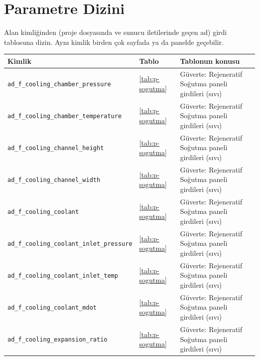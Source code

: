 \documentclass[11pt,a4paper]{article}
\begin{document}
\section{Parametre Dizini}\label{sec:ekd}

Alan kimliğinden (proje dosyasında ve sunucu iletilerinde geçen ad) girdi
tablosuna dizin. Aynı kimlik birden çok sayfada ya da panelde geçebilir.

{\small\begin{longtable}{@{}>{\raggedright\arraybackslash}p{5.2cm}p{1.4cm}>{\raggedright\arraybackslash}p{7.4cm}@{}}
\toprule \textbf{Kimlik} & \textbf{Tablo} & \textbf{Tablonun konusu} \\ \midrule \endhead
\bottomrule \endlastfoot
\texttt{ad\_\allowbreak{}f\_\allowbreak{}cooling\_\allowbreak{}chamber\_\allowbreak{}pressure} & \ref{tab:p-sogutma} & Güverte: Rejeneratif Soğutma paneli girdileri (sıvı) \\
\texttt{ad\_\allowbreak{}f\_\allowbreak{}cooling\_\allowbreak{}chamber\_\allowbreak{}temperature} & \ref{tab:p-sogutma} & Güverte: Rejeneratif Soğutma paneli girdileri (sıvı) \\
\texttt{ad\_\allowbreak{}f\_\allowbreak{}cooling\_\allowbreak{}channel\_\allowbreak{}height} & \ref{tab:p-sogutma} & Güverte: Rejeneratif Soğutma paneli girdileri (sıvı) \\
\texttt{ad\_\allowbreak{}f\_\allowbreak{}cooling\_\allowbreak{}channel\_\allowbreak{}width} & \ref{tab:p-sogutma} & Güverte: Rejeneratif Soğutma paneli girdileri (sıvı) \\
\texttt{ad\_\allowbreak{}f\_\allowbreak{}cooling\_\allowbreak{}coolant} & \ref{tab:p-sogutma} & Güverte: Rejeneratif Soğutma paneli girdileri (sıvı) \\
\texttt{ad\_\allowbreak{}f\_\allowbreak{}cooling\_\allowbreak{}coolant\_\allowbreak{}inlet\_\allowbreak{}pressure} & \ref{tab:p-sogutma} & Güverte: Rejeneratif Soğutma paneli girdileri (sıvı) \\
\texttt{ad\_\allowbreak{}f\_\allowbreak{}cooling\_\allowbreak{}coolant\_\allowbreak{}inlet\_\allowbreak{}temp} & \ref{tab:p-sogutma} & Güverte: Rejeneratif Soğutma paneli girdileri (sıvı) \\
\texttt{ad\_\allowbreak{}f\_\allowbreak{}cooling\_\allowbreak{}coolant\_\allowbreak{}mdot} & \ref{tab:p-sogutma} & Güverte: Rejeneratif Soğutma paneli girdileri (sıvı) \\
\texttt{ad\_\allowbreak{}f\_\allowbreak{}cooling\_\allowbreak{}expansion\_\allowbreak{}ratio} & \ref{tab:p-sogutma} & Güverte: Rejeneratif Soğutma paneli girdileri (sıvı) \\

\end{longtable}}
\end{document}
